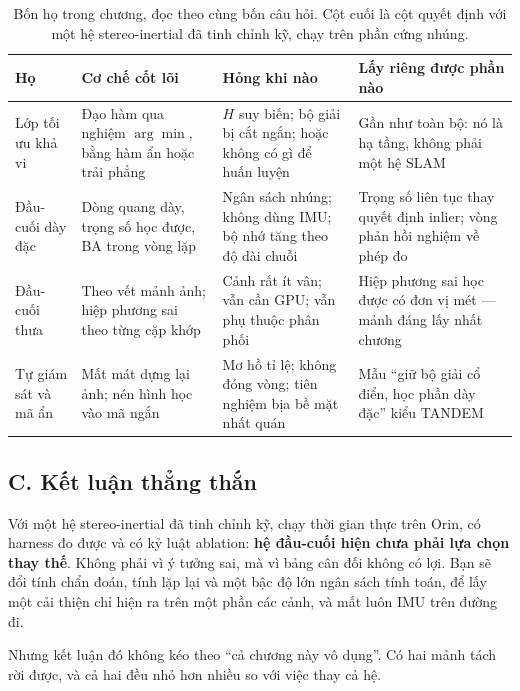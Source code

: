 \documentclass[../../deep_learning.tex]{subfiles}
\begin{document}
\begin{table}[H]\centering\footnotesize
\caption{Bốn họ trong chương, đọc theo cùng bốn câu hỏi. Cột cuối là cột quyết định với một hệ stereo-inertial đã tinh chỉnh kỹ, chạy trên phần cứng nhúng.}
\label{tab:f31-bon-ho}
\begin{tabularx}{\linewidth}{@{}L{2.3cm}L{3.4cm}YL{3.5cm}@{}}
\toprule
\textbf{Họ} & \textbf{Cơ chế cốt lõi} & \textbf{Hỏng khi nào} & \textbf{Lấy riêng được phần nào}\\
\midrule
Lớp tối ưu khả vi & Đạo hàm qua nghiệm \(\arg\min\), bằng hàm ẩn hoặc trải phẳng & \(H\) suy biến; bộ giải bị cắt ngắn; hoặc không có gì để huấn luyện & Gần như toàn bộ: nó là hạ tầng, không phải một hệ SLAM\\
Đầu-cuối dày đặc & Dòng quang dày, trọng số học được, BA trong vòng lặp & Ngân sách nhúng; không dùng IMU; bộ nhớ tăng theo độ dài chuỗi & Trọng số liên tục thay quyết định inlier; vòng phản hồi nghiệm về phép đo\\
Đầu-cuối thưa & Theo vết mảnh ảnh; hiệp phương sai theo từng cặp khớp & Cảnh rất ít vân; vẫn cần GPU; vẫn phụ thuộc phân phối & Hiệp phương sai học được có đơn vị mét --- mảnh đáng lấy nhất chương\\
Tự giám sát và mã ẩn & Mất mát dựng lại ảnh; nén hình học vào mã ngắn & Mơ hồ tỉ lệ; không đóng vòng; tiên nghiệm bịa bề mặt nhất quán & Mẫu ``giữ bộ giải cổ điển, học phần dày đặc'' kiểu TANDEM\\
\bottomrule
\end{tabularx}
\end{table}

\subsection{C. Kết luận thẳng thắn}
Với một hệ stereo-inertial đã tinh chỉnh kỹ, chạy thời gian thực trên Orin, có harness đo được và có kỷ luật ablation: \textbf{hệ đầu-cuối hiện chưa phải lựa chọn thay thế}. Không phải vì ý tưởng sai, mà vì bảng cân đối không có lợi. Bạn sẽ đổi tính chẩn đoán, tính lặp lại và một bậc độ lớn ngân sách tính toán, để lấy một cải thiện chỉ hiện ra trên một phần các cảnh, và mất luôn IMU trên đường đi.

Nhưng kết luận đó không kéo theo ``cả chương này vô dụng''. Có hai mảnh tách rời được, và cả hai đều nhỏ hơn nhiều so với việc thay cả hệ.
\end{document}
